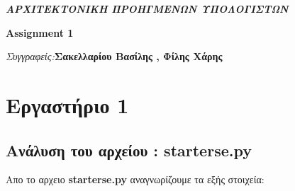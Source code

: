 \documentclass[10pt]{report}
\newcommand{\tu}{\textunderscore}
\begin{document}
\thispagestyle{plain}
\begin{center}
    \Large
    \textbf{\emph{ΑΡΧΙΤΕΚΤΟΝΙΚΗ ΠΡΟΗΓΜΕΝΩΝ ΥΠΟΛΟΓΙΣΤΩΝ}}
        
    \vspace{0.4cm}
    \large
    \textbf{\textbf{Assignment 1}}
        
    \vspace{0.4cm}
    \textit{Συγγραφείς:}\textbf{Σακελλαρίου Βασίλης , Φίλης Χάρης}
       
    \vspace{0.9cm}
\end{center}
\tableofcontents
\chapter{Εργαστήριο 1}
\section{Ανάλυση του αρχείου : starter\tu se.py}
Απο το αρχειο \textbf{starter\tu se.py} αναγνωρίζουμε τα εξής στοιχεία:
\end{document}
